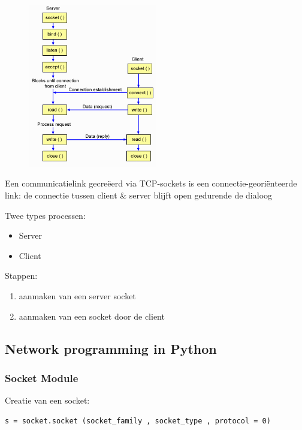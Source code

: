 \documentclass{article}
\begin{document}
\begin{figure}[H]
    \centering
    \includegraphics[width=0.5\textwidth]{client-server-communicatie.png}
    \caption{}
\end{figure}

Een communicatielink gecreëerd via TCP-sockets is een connectie-georiënteerde link: 
de connectie tussen client \& server blijft open gedurende de dialoog

Twee types processen:

\begin{itemize}
    \item Server
    \item Client
\end{itemize}


Stappen:

\begin{enumerate}
    \item aanmaken van een server socket
    \item aanmaken van een socket door de client
\end{enumerate}

\subsection{Network programming in Python}

\subsubsection{Socket Module}

Creatie van een socket:

\begin{verbatim}
s = socket.socket (socket_family , socket_type , protocol = 0)
\end{verbatim}
\end{document}
